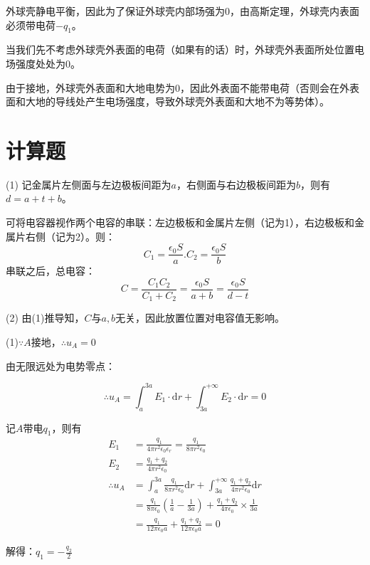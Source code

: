 \documentclass[b5paper,opensource,sourcefont,parskip]{qyxf-book}
\newcommand{\di}[1]{\mathrm{d}#1}
\begin{document}
\solve 外球壳静电平衡，因此为了保证外球壳内部场强为0，由高斯定理，外球壳内表面必须带电荷$ -q_1 $。

当我们先不考虑外球壳外表面的电荷（如果有的话）时，外球壳外表面所处位置电场强度处处为$0$。

由于接地，外球壳外表面和大地电势为0，因此外表面不能带电荷（否则会在外表面和大地的导线处产生电场强度，导致外球壳外表面和大地不为等势体）。

\section{计算题}


\solve (1) 记金属片左侧面与左边极板间距为$ a $，右侧面与右边极板间距为$ b $，则有$ d=a+t+b $。

可将电容器视作两个电容的串联：左边极板和金属片左侧（记为1），右边极板和金属片右侧（记为2）。则：
\[C_1=\frac{\epsilon_0 S}{a}.C_2=\frac{\epsilon_0 S}{b}\]
串联之后，总电容：
\[C=\frac{C_1C_2}{C_1+C_2}=\frac{\epsilon_0 S}{a+b}=\frac{\epsilon_0 S}{d-t}\]

(2) 由(1)推导知，$ C $与$ a,b $无关，因此放置位置对电容值无影响。


\solve (1)$ \because A$接地，$ \therefore u_A=0 $

由无限远处为电势零点：

\begin{equation}
\therefore u_A=\int_a^{3a} E_1\cdot\di{r} +\int_{3a}^{+\infty} E_2\cdot\di{r} =0
\end{equation}

记$ A $带电$ q_1 $，则有
\begin{equation}
\begin{aligned}
E_1&=\frac{q_1}{4\pi r^2\epsilon_0\epsilon_r}=\frac{q_1}{8\pi r^2\epsilon_0}\\
E_2&=\frac{q_1+q_2}{4\pi r^2\epsilon_0}\\
\therefore u_A&=\int_a^{3a}\frac{q_1}{8\pi r^2\epsilon_0}\di{r}+\int_{3a}^{+\infty}\frac{q_1+q_2}{4\pi r^2\epsilon_0}\di{r}\\
&=\frac{q_1}{8\pi\epsilon_0}\left(\frac{1}{a}-\frac{1}{3a}\right)+\frac{q_1+q_2}{4\pi\epsilon_0}\times \frac{1}{3a}\\
&=\frac{q_1}{12\pi\epsilon_0a}+\frac{q_1+q_2}{12\pi\epsilon_0a}=0
\end{aligned}
\end{equation}

解得：$ q_1=-\frac{q_2}{2} $
\end{document}
